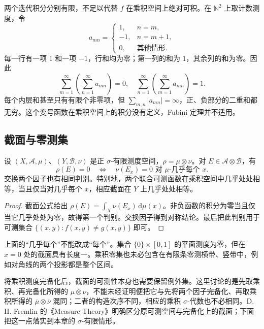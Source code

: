 两个迭代积分分别有限，不足以代替 \(f\) 在乘积空间上绝对可积。在 \(\mathbb N^2\) 上取计数测度，令
\[
a_{mn}=\begin{cases}
1,&n=m,\\
-1,&n=m+1,\\
0,&\text{其他情形}.
\end{cases}
\]
每一行有一项 \(1\) 和一项 \(-1\)，行和均为零；第一列的和为 \(1\)，其余列的和为零。因此
\[
\sum_{m=1}^{\infty}\left(\sum_{n=1}^{\infty}a_{mn}\right)=0,
\quad
\sum_{n=1}^{\infty}\left(\sum_{m=1}^{\infty}a_{mn}\right)=1.
\]
每个内层和甚至只有有限个非零项，但 \(\sum_{m,n}|a_{mn}|=\infty\)，正、负部分的二重和都无穷。这个变号函数在乘积空间上的积分没有定义，Fubini 定理并不适用。

\subsection{截面与零测集}
\label{b1:subsec:070303}

\begin{proposition}\label{b1:prop:product-null-sections}
设 \((X,\mathcal A,\mu)\)、\((Y,\mathcal B,\nu)\) 是正 \(\sigma\)-有限测度空间，\(\rho=\mu\otimes\nu\)。对 \(E\in\mathcal A\otimes\mathcal B\)，有
\[
\rho(E)=0
\quad\Longleftrightarrow\quad
\nu(E_x)=0\text{ 对 }\mu\text{-几乎每个 }x.
\]
交换两个因子也有相同判别。特别地，两个联合可测函数在乘积空间中几乎处处相等，当且仅当对几乎每个 \(x\)，相应截面在 \(Y\) 上几乎处处相等。
\end{proposition}
\begin{proof}
截面公式给出 \(\rho(E)=\int_X\nu(E_x)\,\mathrm d\mu(x)\)。非负函数的积分为零当且仅当它几乎处处为零，故得第一个判别。交换因子得到对称结论。最后把此判别用于可测集合 \(\{(x,y):f(x,y)\neq g(x,y)\}\) 即可。
\end{proof}

上面的“几乎每个”不能改成“每个”。集合 \(\{0\}\times[0,1]\) 的平面测度为零，但在 \(x=0\) 处的截面具有长度一。乘积零集也未必包含在有限条零测横带、竖带中，例如对角线的两个投影都是整个区间。

\ProseParagraphBreak

将乘积测度完备化后，截面的可测性本身也需要保留例外集。这里讨论的是先取乘积、再完备化所得的 \(\overline{\mu\otimes\nu}\)，不能未经证明便把它与先将两个因子完备化、再取乘积所得的 \(\overline\mu\otimes\overline\nu\) 混同；二者的构造次序不同，相应的乘积 \(\sigma\)-代数也不必相同。D. H. Fremlin 的《Measure Theory》\cite[Volume 2, \S252]{Fremlin2016Measure}明确区分原可测空间与完备化上的截面；下面把这一点落实到本章的 \(\sigma\)-有限情形。


